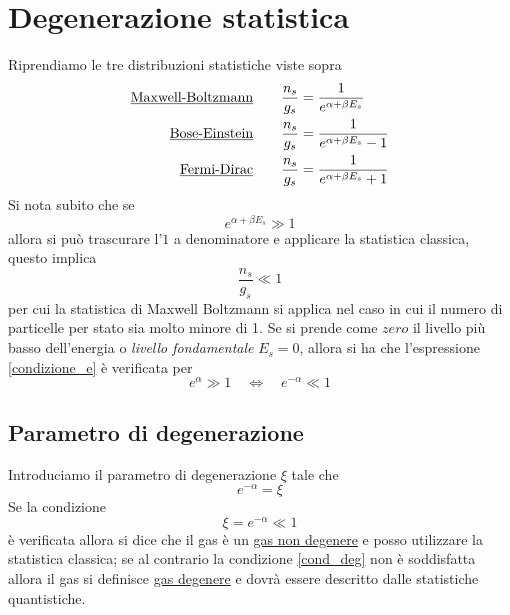 
\section{Degenerazione statistica}
Riprendiamo le tre distribuzioni statistiche viste sopra
\begin{equation}
\begin{split}
\mbox{\underline{Maxwell-Boltzmann}}  \quad\quad  \frac{n_s}{g_s} & = \frac{1}{e^{\alpha + \beta E_s}} \\
\mbox{\underline{Bose-Einstein}}  \quad\quad  \frac{n_s}{g_s} & = \frac{1}{e^{\alpha + \beta E_s} - 1} \\
\mbox{\underline{Fermi-Dirac}}  \quad\quad  \frac{n_s}{g_s} & = \frac{1}{e^{\alpha + \beta E_s} + 1 } 
\end{split}
\end{equation}
Si nota subito che se 
\begin{equation}
e^{\alpha + \beta E_s} \gg 1
\label{condizione_e}
\end{equation}
allora si può trascurare l'$1$ a denominatore e applicare la statistica classica, questo implica
\begin{equation}
\frac{n_s}{g_s} \ll 1
\end{equation}
per cui la statistica di Maxwell Boltzmann si applica nel caso in cui il numero di particelle per stato sia molto minore di 1.
Se si prende come $zero$ il livello più basso dell'energia o \textit{livello fondamentale} $E_s = 0$, allora si ha che l'espressione \ref{condizione_e} è verificata per
\begin{equation}
e^{\alpha} \gg 1 \quad\Leftrightarrow\quad  e^{-\alpha} \ll 1
\end{equation}


\subsection{Parametro di degenerazione} Introduciamo il parametro di degenerazione $\xi$ tale che 
\begin{equation}
e^{-\alpha} = \xi 
\end{equation}
Se la condizione 
\begin{equation}
\xi = e^{-\alpha} \ll 1
\label{cond_deg}
\end{equation}
è verificata allora si dice che il gas è un \underline{gas non degenere} e posso utilizzare la statistica classica;
se al contrario la condizione \ref{cond_deg} non è soddisfatta allora il gas si definisce \underline{gas degenere} e dovrà essere descritto dalle statistiche quantistiche.

